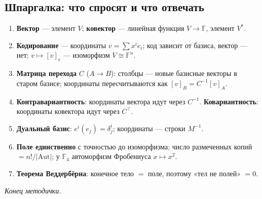 \documentclass[11pt]{article}
\newcommand{\F}{\mathbb{F}}
\begin{document}
\subsection{Шпаргалка: что спросят и что отвечать}
\begin{idea}
\begin{enumerate}[leftmargin=1.6em]
  \item \textbf{Вектор} — элемент $V$; \textbf{ковектор} — линейная функция $V\to\F$,
        элемент $V^{*}$.
  \item \textbf{Кодирование} — координаты $v=\sum x^i e_i$; код зависит от базиса,
        вектор — нет; $v\mapsto[v]_e$ — изоморфизм $V\cong\F^n$.
  \item \textbf{Матрица перехода} $C$ ($A\to B$): столбцы — новые базисные векторы в
        старом базисе; координаты пересчитываются как $[v]_B=C^{-1}[v]_A$.
  \item \textbf{Контравариантность}: координаты вектора идут через $C^{-1}$.
        \textbf{Ковариантность}: координаты ковектора идут через $C^{\top}$.
  \item \textbf{Дуальный базис}: $e^i(e_j)=\delta^i_j$; координаты — строки $M^{-1}$.
  \item \textbf{Поле единственно} с точностью до изоморфизма; число размеченных копий
        $=n!/|\mathrm{Aut}|$; у $\F_4$ автоморфизм Фробениуса $x\mapsto x^2$.
  \item \textbf{Теорема Веддербёрна}: конечное тело $=$ поле, поэтому «тел не полей» $=0$.
  \end{enumerate}
\end{idea}

\vspace{1em}
\begin{center}\itshape Конец методички.\end{center}
\end{document}
